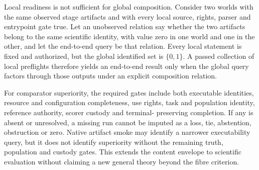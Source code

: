 Local readiness is not sufficient for global composition. Consider two worlds
with the same observed stage artifacts and with every local source, rights,
parser and entrypoint gate true. Let an unobserved relation say whether the two
artifacts belong to the same scientific identity, with value zero in one world
and one in the other, and let the end-to-end query be that relation. Every
local statement is fixed and authorized, but the global identified set is
$\{0,1\}$. A passed collection of local preflights therefore yields an
end-to-end result only when the global query factors through those outputs
under an explicit composition relation.

For comparator superiority, the required gates include both executable
identities, resource and configuration completeness, use rights, task and
population identity, reference authority, scorer custody and terminal-
preserving completion. If any is absent or unresolved, a missing run cannot be
imputed as a loss, tie, abstention, obstruction or zero. Native artifact smoke
may identify a narrower executability query, but it does not identify
superiority without the remaining truth, population and custody gates. This
extends the content envelope to scientific evaluation without claiming a new
general theory beyond the fibre criterion.

\endinput
